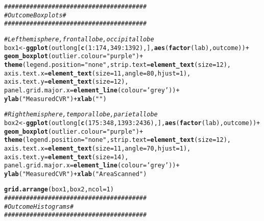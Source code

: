 \documentclass[10pt]{article}\usepackage[]{graphicx}\usepackage[]{color}
\makeatletter
\newcommand{\hlnum}[1]{\textcolor[rgb]{0.686,0.059,0.569}{#1}}%
\newcommand{\hlstr}[1]{\textcolor[rgb]{0.192,0.494,0.8}{#1}}%
\newcommand{\hlcom}[1]{\textcolor[rgb]{0.678,0.584,0.686}{\textit{#1}}}%
\newcommand{\hlopt}[1]{\textcolor[rgb]{0,0,0}{#1}}%
\newcommand{\hlstd}[1]{\textcolor[rgb]{0.345,0.345,0.345}{#1}}%
\newcommand{\hlkwb}[1]{\textcolor[rgb]{0.69,0.353,0.396}{#1}}%
\newcommand{\hlkwc}[1]{\textcolor[rgb]{0.333,0.667,0.333}{#1}}%
\newcommand{\hlkwd}[1]{\textcolor[rgb]{0.737,0.353,0.396}{\textbf{#1}}}%
\newenvironment{kframe}{%
 \def\at@end@of@kframe{}%
 \ifinner\ifhmode%
  \def\at@end@of@kframe{\end{minipage}}%
  \begin{minipage}{\columnwidth}%
 \fi\fi%
 \def\FrameCommand##1{\hskip\@totalleftmargin \hskip-\fboxsep
 \colorbox{shadecolor}{##1}\hskip-\fboxsep
     \hskip-\linewidth \hskip-\@totalleftmargin \hskip\columnwidth}%
 \MakeFramed {\advance\hsize-\width
   \@totalleftmargin\z@ \linewidth\hsize
   \@setminipage}}%
 {\par\unskip\endMakeFramed%
 \at@end@of@kframe}
\newenvironment{knitrout}{}{} %
\makeatother
\begin{document}
\begin{knitrout}
\begin{kframe}
\begin{alltt}
\hlcom{#######################################}
\hlcom{#  Outcome Boxplots                   #}
\hlcom{#######################################}

\hlcom{#Left hemisphere, frontal lobe, occipital lobe}
\hlstd{box1} \hlkwb{<-} \hlkwd{ggplot}\hlstd{(outlong[}\hlkwd{c}\hlstd{(}\hlnum{1}\hlopt{:}\hlnum{174}\hlstd{,}\hlnum{349}\hlopt{:}\hlnum{1392}\hlstd{),],} \hlkwd{aes}\hlstd{(}\hlkwd{factor}\hlstd{(lab), outcome))} \hlopt{+}
  \hlkwd{geom_boxplot}\hlstd{(}\hlkwc{outlier.colour} \hlstd{=} \hlstr{"purple"}\hlstd{)} \hlopt{+}
  \hlkwd{theme}\hlstd{(}\hlkwc{legend.position}\hlstd{=}\hlstr{"none"}\hlstd{,} \hlkwc{strip.text} \hlstd{=} \hlkwd{element_text}\hlstd{(}\hlkwc{size}\hlstd{=}\hlnum{12}\hlstd{),}
        \hlkwc{axis.text.x} \hlstd{=} \hlkwd{element_text}\hlstd{(}\hlkwc{size}\hlstd{=}\hlnum{11}\hlstd{,} \hlkwc{angle} \hlstd{=} \hlnum{80}\hlstd{,} \hlkwc{hjust} \hlstd{=} \hlnum{1}\hlstd{),}
        \hlkwc{axis.text.y}  \hlstd{=} \hlkwd{element_text}\hlstd{(}\hlkwc{size}\hlstd{=}\hlnum{12}\hlstd{),}
        \hlkwc{panel.grid.major.x}\hlstd{=}\hlkwd{element_line}\hlstd{(}\hlkwc{colour}\hlstd{=}\hlstr{'grey'}\hlstd{))} \hlopt{+}
  \hlkwd{ylab}\hlstd{(}\hlstr{"Measured CVR"}\hlstd{)} \hlopt{+} \hlkwd{xlab}\hlstd{(}\hlstr{""}\hlstd{)}

\hlcom{#Right hemisphere, temporal lobe, parietal lobe}
\hlstd{box2} \hlkwb{<-} \hlkwd{ggplot}\hlstd{(outlong[}\hlkwd{c}\hlstd{(}\hlnum{175}\hlopt{:}\hlnum{348}\hlstd{,}\hlnum{1393}\hlopt{:}\hlnum{2436}\hlstd{),],} \hlkwd{aes}\hlstd{(}\hlkwd{factor}\hlstd{(lab), outcome))} \hlopt{+}
  \hlkwd{geom_boxplot}\hlstd{(}\hlkwc{outlier.colour} \hlstd{=} \hlstr{"purple"}\hlstd{)} \hlopt{+}
  \hlkwd{theme}\hlstd{(}\hlkwc{legend.position}\hlstd{=}\hlstr{"none"}\hlstd{,} \hlkwc{strip.text} \hlstd{=} \hlkwd{element_text}\hlstd{(}\hlkwc{size}\hlstd{=}\hlnum{12}\hlstd{),}
        \hlkwc{axis.text.x} \hlstd{=} \hlkwd{element_text}\hlstd{(}\hlkwc{size}\hlstd{=}\hlnum{11}\hlstd{,} \hlkwc{angle} \hlstd{=} \hlnum{70}\hlstd{,} \hlkwc{hjust} \hlstd{=} \hlnum{1}\hlstd{),}
        \hlkwc{axis.text.y}  \hlstd{=} \hlkwd{element_text}\hlstd{(}\hlkwc{size}\hlstd{=}\hlnum{14}\hlstd{),}
        \hlkwc{panel.grid.major.x}\hlstd{=}\hlkwd{element_line}\hlstd{(}\hlkwc{colour}\hlstd{=}\hlstr{'grey'}\hlstd{))} \hlopt{+}
  \hlkwd{ylab}\hlstd{(}\hlstr{"Measured CVR"}\hlstd{)} \hlopt{+} \hlkwd{xlab}\hlstd{(}\hlstr{"Area Scanned"}\hlstd{)}

\hlkwd{grid.arrange}\hlstd{(box1, box2,} \hlkwc{ncol} \hlstd{=} \hlnum{1}\hlstd{)}
\hlcom{#######################################}
\hlcom{#  Outcome Histograms                 #}
\hlcom{#######################################}


\end{alltt}
\end{kframe}
\end{knitrout}
\end{document}

